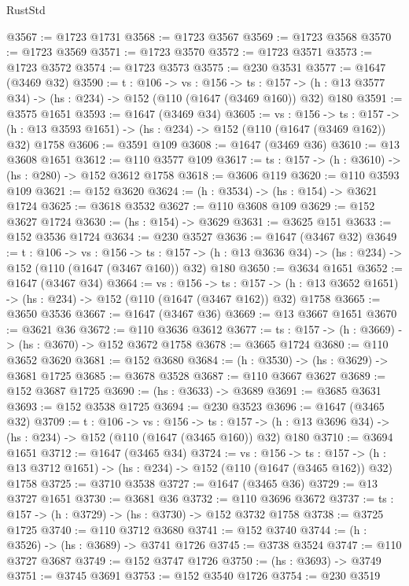 \begin{lexlean}{RustStd}
\begin{coremodule}
@3567 := @1723 @1731
@3568 := @1723 @3567
@3569 := @1723 @3568
@3570 := @1723 @3569
@3571 := @1723 @3570
@3572 := @1723 @3571
@3573 := @1723 @3572
@3574 := @1723 @3573
@3575 := @230 @3531
@3577 := @1647 (@3469 @32)
@3590 := {t : @106} ->
  {vs : @156} ->
  {ts : @157} -> (h : @13 @3577 @34) -> (hs : @234) -> @152 (@110 (@1647 (@3469 @160)) @32) @180
@3591 := @3575 @1651
@3593 := @1647 (@3469 @34)
@3605 := {vs : @156} ->
  {ts : @157} -> (h : @13 @3593 @1651) -> (hs : @234) -> @152 (@110 (@1647 (@3469 @162)) @32) @1758
@3606 := @3591 @109
@3608 := @1647 (@3469 @36)
@3610 := @13 @3608 @1651
@3612 := @110 @3577 @109
@3617 := {ts : @157} -> (h : @3610) -> (hs : @280) -> @152 @3612 @1758
@3618 := @3606 @119
@3620 := @110 @3593 @109
@3621 := @152 @3620
@3624 := (h : @3534) -> (hs : @154) -> @3621 @1724
@3625 := @3618 @3532
@3627 := @110 @3608 @109
@3629 := @152 @3627 @1724
@3630 := (hs : @154) -> @3629
@3631 := @3625 @151
@3633 := @152 @3536 @1724
@3634 := @230 @3527
@3636 := @1647 (@3467 @32)
@3649 := {t : @106} ->
  {vs : @156} ->
  {ts : @157} -> (h : @13 @3636 @34) -> (hs : @234) -> @152 (@110 (@1647 (@3467 @160)) @32) @180
@3650 := @3634 @1651
@3652 := @1647 (@3467 @34)
@3664 := {vs : @156} ->
  {ts : @157} -> (h : @13 @3652 @1651) -> (hs : @234) -> @152 (@110 (@1647 (@3467 @162)) @32) @1758
@3665 := @3650 @3536
@3667 := @1647 (@3467 @36)
@3669 := @13 @3667 @1651
@3670 := @3621 @36
@3672 := @110 @3636 @3612
@3677 := {ts : @157} -> (h : @3669) -> (hs : @3670) -> @152 @3672 @1758
@3678 := @3665 @1724
@3680 := @110 @3652 @3620
@3681 := @152 @3680
@3684 := (h : @3530) -> (hs : @3629) -> @3681 @1725
@3685 := @3678 @3528
@3687 := @110 @3667 @3627
@3689 := @152 @3687 @1725
@3690 := (hs : @3633) -> @3689
@3691 := @3685 @3631
@3693 := @152 @3538 @1725
@3694 := @230 @3523
@3696 := @1647 (@3465 @32)
@3709 := {t : @106} ->
  {vs : @156} ->
  {ts : @157} -> (h : @13 @3696 @34) -> (hs : @234) -> @152 (@110 (@1647 (@3465 @160)) @32) @180
@3710 := @3694 @1651
@3712 := @1647 (@3465 @34)
@3724 := {vs : @156} ->
  {ts : @157} -> (h : @13 @3712 @1651) -> (hs : @234) -> @152 (@110 (@1647 (@3465 @162)) @32) @1758
@3725 := @3710 @3538
@3727 := @1647 (@3465 @36)
@3729 := @13 @3727 @1651
@3730 := @3681 @36
@3732 := @110 @3696 @3672
@3737 := {ts : @157} -> (h : @3729) -> (hs : @3730) -> @152 @3732 @1758
@3738 := @3725 @1725
@3740 := @110 @3712 @3680
@3741 := @152 @3740
@3744 := (h : @3526) -> (hs : @3689) -> @3741 @1726
@3745 := @3738 @3524
@3747 := @110 @3727 @3687
@3749 := @152 @3747 @1726
@3750 := (hs : @3693) -> @3749
@3751 := @3745 @3691
@3753 := @152 @3540 @1726
@3754 := @230 @3519

\end{coremodule}
\end{lexlean}
